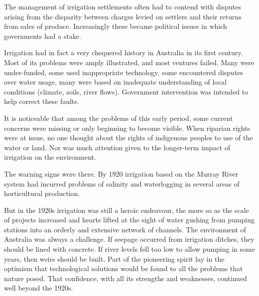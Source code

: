 The management of irrigation settlements often had to contend with
disputes arising from the disparity between charges levied on settlers
and their returns from sales of produce. Increasingly these became
political issues in which governments had a stake.

\bigskip\noindent
Irrigation had in fact a very chequered history in Australia in its
first century. Most of its problems were amply illustrated, and most
ventures failed. Many were under-funded, some used inappropriate
technology, some encountered disputes over water usage, many were
based on inadequate understanding of local conditions (climate, soils,
river flows). Government intervention was intended to help correct
these faults.

It is noticeable that among the problems of this early period, some
current concerns were missing or only beginning to become
visible. When riparian rights were at issue, no one thought about the
rights of indigenous peoples to use of the water or land. Nor was much
attention given to the longer-term impact of irrigation on the
environment.

The warning signs were there. By 1920 irrigation based on the Murray
River system had incurred problems of salinity and
waterlogging in several areas of
horticultural production.

But in the 1920s irrigation was still a heroic endeavour, the more so
as the scale of projects increased and hearts lifted at the sight of
water gushing from pumping stations into an orderly and extensive
network of channels. The
environment of Australia was always a challenge. If
seepage occurred from irrigation ditches, they should
be lined with concrete. If river levels fell too low to allow pumping
in some years, then weirs should be built. Part of the pioneering
spirit lay in the optimism that technological solutions would be found
to all the problems that nature posed. That confidence, with all its
strengths and weaknesses, continued well beyond the 1920s.
